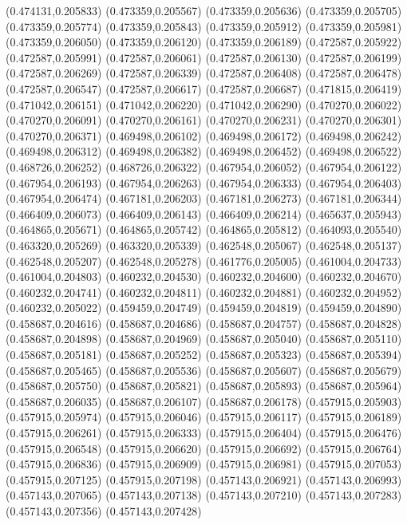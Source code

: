 (0.474131,0.205833)
(0.473359,0.205567)
(0.473359,0.205636)
(0.473359,0.205705)
(0.473359,0.205774)
(0.473359,0.205843)
(0.473359,0.205912)
(0.473359,0.205981)
(0.473359,0.206050)
(0.473359,0.206120)
(0.473359,0.206189)
(0.472587,0.205922)
(0.472587,0.205991)
(0.472587,0.206061)
(0.472587,0.206130)
(0.472587,0.206199)
(0.472587,0.206269)
(0.472587,0.206339)
(0.472587,0.206408)
(0.472587,0.206478)
(0.472587,0.206547)
(0.472587,0.206617)
(0.472587,0.206687)
(0.471815,0.206419)
(0.471042,0.206151)
(0.471042,0.206220)
(0.471042,0.206290)
(0.470270,0.206022)
(0.470270,0.206091)
(0.470270,0.206161)
(0.470270,0.206231)
(0.470270,0.206301)
(0.470270,0.206371)
(0.469498,0.206102)
(0.469498,0.206172)
(0.469498,0.206242)
(0.469498,0.206312)
(0.469498,0.206382)
(0.469498,0.206452)
(0.469498,0.206522)
(0.468726,0.206252)
(0.468726,0.206322)
(0.467954,0.206052)
(0.467954,0.206122)
(0.467954,0.206193)
(0.467954,0.206263)
(0.467954,0.206333)
(0.467954,0.206403)
(0.467954,0.206474)
(0.467181,0.206203)
(0.467181,0.206273)
(0.467181,0.206344)
(0.466409,0.206073)
(0.466409,0.206143)
(0.466409,0.206214)
(0.465637,0.205943)
(0.464865,0.205671)
(0.464865,0.205742)
(0.464865,0.205812)
(0.464093,0.205540)
(0.463320,0.205269)
(0.463320,0.205339)
(0.462548,0.205067)
(0.462548,0.205137)
(0.462548,0.205207)
(0.462548,0.205278)
(0.461776,0.205005)
(0.461004,0.204733)
(0.461004,0.204803)
(0.460232,0.204530)
(0.460232,0.204600)
(0.460232,0.204670)
(0.460232,0.204741)
(0.460232,0.204811)
(0.460232,0.204881)
(0.460232,0.204952)
(0.460232,0.205022)
(0.459459,0.204749)
(0.459459,0.204819)
(0.459459,0.204890)
(0.458687,0.204616)
(0.458687,0.204686)
(0.458687,0.204757)
(0.458687,0.204828)
(0.458687,0.204898)
(0.458687,0.204969)
(0.458687,0.205040)
(0.458687,0.205110)
(0.458687,0.205181)
(0.458687,0.205252)
(0.458687,0.205323)
(0.458687,0.205394)
(0.458687,0.205465)
(0.458687,0.205536)
(0.458687,0.205607)
(0.458687,0.205679)
(0.458687,0.205750)
(0.458687,0.205821)
(0.458687,0.205893)
(0.458687,0.205964)
(0.458687,0.206035)
(0.458687,0.206107)
(0.458687,0.206178)
(0.457915,0.205903)
(0.457915,0.205974)
(0.457915,0.206046)
(0.457915,0.206117)
(0.457915,0.206189)
(0.457915,0.206261)
(0.457915,0.206333)
(0.457915,0.206404)
(0.457915,0.206476)
(0.457915,0.206548)
(0.457915,0.206620)
(0.457915,0.206692)
(0.457915,0.206764)
(0.457915,0.206836)
(0.457915,0.206909)
(0.457915,0.206981)
(0.457915,0.207053)
(0.457915,0.207125)
(0.457915,0.207198)
(0.457143,0.206921)
(0.457143,0.206993)
(0.457143,0.207065)
(0.457143,0.207138)
(0.457143,0.207210)
(0.457143,0.207283)
(0.457143,0.207356)
(0.457143,0.207428)
